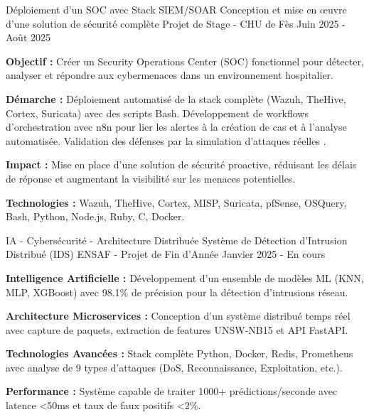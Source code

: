 
\begin{cventries}

  \cventry
  {Déploiement d'un SOC avec Stack SIEM/SOAR}
  {Conception et mise en œuvre d'une solution de sécurité complète} %
  {Projet de Stage - CHU de Fès} %
  {Juin 2025 - Août 2025} %
  {
    \begin{cvitems}
      \item {\textbf{Objectif :} Créer un Security Operations Center (SOC) fonctionnel pour détecter, analyser et répondre aux cybermenaces dans un environnement hospitalier.}
      \item {\textbf{Démarche :} Déploiement automatisé de la stack complète (Wazuh, TheHive, Cortex, Suricata) avec des scripts Bash. Développement de workflows d'orchestration avec n8n pour lier les alertes à la création de cas et à l'analyse automatisée. Validation des défenses par la simulation d'attaques réelles .}
      \item {\textbf{Impact :} Mise en place d'une solution de sécurité proactive, réduisant les délais de réponse et augmentant la visibilité sur les menaces potentielles.}
      \item {\textbf{Technologies :} Wazuh, TheHive, Cortex, MISP, Suricata, pfSense, OSQuery, Bash, Python, Node.js, Ruby, C, Docker.}
    \end{cvitems}
  }
  \cventry
  {IA - Cybersécurité - Architecture Distribuée}
  {Système de Détection d'Intrusion Distribué (IDS)} %
  {ENSAF - Projet de Fin d'Année} %
  {Janvier 2025 - En cours} %
  {
    \begin{cvitems} %
      \item {
                  \textbf{Intelligence Artificielle :}
                  Développement d'un ensemble de modèles ML (KNN, MLP, XGBoost) avec 98.1\% de précision pour la détection d'intrusions réseau.}
      \item {
                  \textbf{Architecture Microservices :}
                  Conception d'un système distribué temps réel avec capture de paquets, extraction de features UNSW-NB15 et API FastAPI.}
      \item {
                  \textbf{Technologies Avancées :}
                  Stack complète Python, Docker, Redis, Prometheus avec analyse de 9 types d'attaques (DoS, Reconnaissance, Exploitation, etc.).}
      \item {
                  \textbf{Performance :}
                  Système capable de traiter 1000+ prédictions/seconde avec latence <50ms et taux de faux positifs <2\%.}
    \end{cvitems}
  }


\end{cventries}
